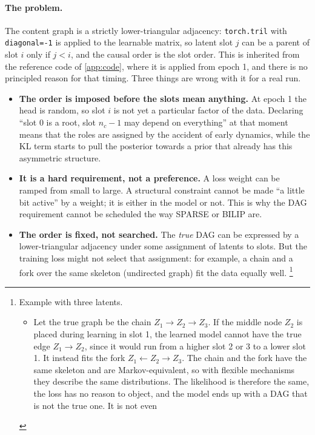 \paragraph{The problem.}
The content graph is a strictly lower-triangular adjacency: \texttt{torch.tril} with
\texttt{diagonal=-1} is applied to the learnable matrix, so latent slot $j$ can be a
parent of slot $i$ only if $j<i$, and the causal order is the slot order. This is
inherited from the reference code of \cref{app:code}, where it is applied from epoch 1,
and there is no principled reason for that timing. Three things are wrong with it for
a real run.
\begin{itemize}[leftmargin=1.5em]
\item \textbf{The order is imposed before the slots mean anything.} At epoch 1 the head
      is random, so slot $i$ is not yet a particular factor of the data. Declaring
      ``slot 0 is a root, slot $n_c\!-\!1$ may depend on everything'' at that moment means
      that the roles are assigned by the accident of early dynamics, while the KL term
      starts to pull the posterior towards a prior that already has this asymmetric
      structure.
\item \textbf{It is a hard requirement, not a preference.} A loss weight can be ramped
      from small to large. A structural constraint cannot be made ``a little bit
      active'' by a weight; it is either in the model or not. This is why the DAG
      requirement cannot be scheduled the way SPARSE or BILIP are.
\item \textbf{The order is fixed, not searched.} The \emph{true} DAG can be expressed by a 
      lower-triangular adjacency under some assignment of latents to slots. But the training loss 
      might not select that assignment: for example, a chain and a fork over the same skeleton
      (undirected graph) fit the data equally well.
\footnote{Example with three latents.
\begin{itemize}
\item Let the true graph be the chain $Z_1\to Z_2\to Z_3$. 
If the middle node $Z_2$ is placed during learning in slot 1, the learned model cannot have the
true edge $Z_1\to Z_2$, since it would run from a higher slot 2 or 3 to a lower slot 1. It instead
fits the fork $Z_1\leftarrow Z_2\to Z_3$. The chain and the fork have the same
skeleton and are Markov-equivalent, so with flexible mechanisms they describe the
same distributions. The likelihood is therefore the same, the loss has no reason to
object, and the model ends up with a DAG that is not the true one. It is not even

\end{itemize}}
\end{itemize}
